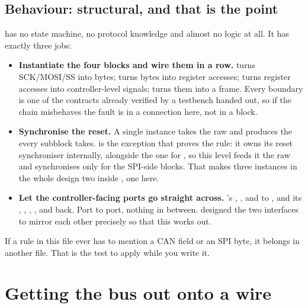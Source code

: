 \subsection*{Behaviour: structural, and that is the point}
 has no state machine, no protocol knowledge and almost no logic at all. It has
exactly three jobs:
\begin{itemize}
  \item \textbf{Instantiate the four blocks and wire them in a row.}  turns
    SCK/MOSI/SS into bytes;  turns bytes into register accesses;
     turns register accesses into controller-level signals;
     turns them into a frame. Every boundary is one of the contracts already
    verified by a testbench handed out, so if the chain misbehaves the fault is in a connection here,
    not in a block.
  \item \textbf{Synchronise the reset.} A single  instance takes the raw
     and produces the  every subblock takes.  is
    the exception that proves the rule: it owns its reset synchroniser internally, alongside the one
    for , so this level feeds it the raw  and synchronises only for the
    SPI-side blocks. That makes three  instances in the whole design \textemdash{}
    two inside , one here.
  \item \textbf{Let the controller-facing ports go straight across.} 's
    , ,  and  to , and its
    , , , ,  and 
    back. Port to port, nothing in between.  designed the two interfaces to mirror
    each other precisely so that this works out.
\end{itemize}

If a rule in this file ever has to mention a CAN field or an SPI byte, it belongs in another file.
That is the test to apply while you write it.

\section{Getting the bus out onto a wire}
\label{c19:sec:wire}

